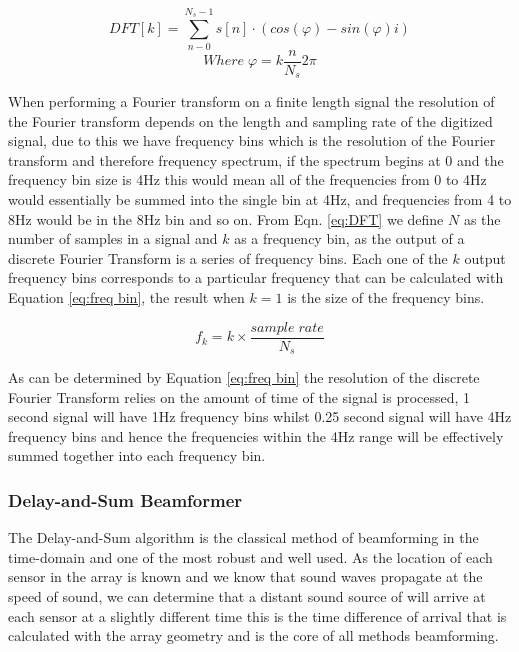 \documentclass{UoNMCHA}
\numberwithin{equation}{section}
\begin{document}
    \begin{equation}
        DFT[k]=\sum_{n-0}^{N_s-1}s[n] \cdot (cos(\varphi) - sin(\varphi)i)
        \label{eq:DFT}
    \end{equation}
        \begin{equation*}
        Where \; \varphi = k \frac{n}{N_s}2 \pi
    \end{equation*}
    
    When performing a Fourier transform on a finite length signal the resolution of the Fourier transform depends on the length and sampling rate of the digitized signal, due to this we have frequency bins which is the resolution of the Fourier transform and therefore frequency spectrum, if the spectrum begins at 0 and the frequency bin size is 4Hz this would mean all of the frequencies from 0 to 4Hz would essentially be summed into the single bin at 4Hz, and frequencies from 4 to 8Hz would be in the 8Hz bin and so on. From Eqn. \ref{eq:DFT} we define $N$ as the number of samples in a signal and $k$ as a frequency bin, as the output of a discrete Fourier Transform is a series of frequency bins. Each one of the $k$ output frequency bins corresponds to a particular frequency that can be calculated with Equation \ref{eq:freq bin}, the result when $k=1$ is the size of the frequency bins.
    
    \begin{equation}
        f_k = k \times \frac{sample\;rate}{N_s}
        \label{eq:freq bin}
    \end{equation}
    
    As can be determined by Equation \ref{eq:freq bin} the resolution of the discrete Fourier Transform relies on the amount of time of the signal is processed, 1 second signal will have 1Hz frequency bins whilst 0.25 second signal will have 4Hz frequency bins and hence the frequencies within the 4Hz range will be effectively summed together into each frequency bin.
    
\subsubsection{Delay-and-Sum Beamformer} \label{sec:DAS Algorithm}
    The Delay-and-Sum algorithm is the classical method of beamforming in the time-domain and one of the most robust and well used. As the location of each sensor in the array is known and we know that sound waves propagate at the speed of sound, we can determine that a distant sound source of will arrive at each sensor at a slightly different time this is the time difference of arrival that is calculated with the array geometry and is the core of all methods beamforming.
    
\end{document}
